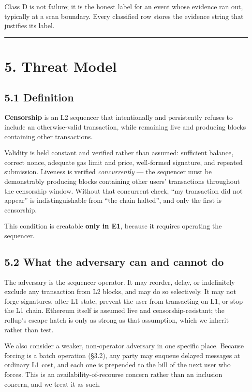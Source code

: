 \documentclass[conference]{IEEEtran}
\renewcommand{\_}{\textunderscore\allowbreak}
\begin{document}
Class D is not failure; it is the honest label for an event whose
evidence ran out, typically at a scan boundary. Every classified row
stores the evidence string that justifies its label.

\begin{center}\rule{0.5\linewidth}{0.5pt}\end{center}

\section{5. Threat Model}\label{threat-model}

\subsection{5.1 Definition}\label{definition}

\textbf{Censorship} is an L2 sequencer that intentionally and
persistently refuses to include an otherwise-valid transaction, while
remaining live and producing blocks containing other transactions.

Validity is held constant and verified rather than assumed: sufficient
balance, correct nonce, adequate gas limit and price, well-formed
signature, and repeated submission. Liveness is verified
\emph{concurrently} --- the sequencer must be demonstrably producing
blocks containing other users' transactions throughout the censorship
window. Without that concurrent check, ``my transaction did not appear''
is indistinguishable from ``the chain halted'', and only the first is
censorship.

This condition is creatable \textbf{only in E1}, because it requires
operating the sequencer.

\subsection{5.2 What the adversary can and cannot
do}\label{what-the-adversary-can-and-cannot-do}

The adversary is the sequencer operator. It may reorder, delay, or
indefinitely exclude any transaction from L2 blocks, and may do so
selectively. It may not forge signatures, alter L1 state, prevent the
user from transacting on L1, or stop the L1 chain. Ethereum itself is
assumed live and censorship-resistant; the rollup's escape hatch is only
as strong as that assumption, which we inherit rather than test.

We also consider a weaker, non-operator adversary in one specific place.
Because forcing is a batch operation (§3.2), any party may enqueue
delayed messages at ordinary L1 cost, and each one is prepended to the
bill of the next user who forces. This is an availability-of-recourse
concern rather than an inclusion concern, and we treat it as such.
\end{document}
